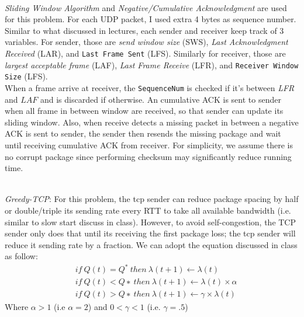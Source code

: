 \documentclass[12pt]{article}
\newenvironment{problem}[2][Problem]{\begin{trivlist}
\item[\hskip \labelsep {\bfseries #1}\hskip \labelsep {\bfseries #2.}]}{\end{trivlist}}
\begin{document}
\begin{problem}{2} \ \\
    \textit{Sliding Window Algorithm} and \textit{Negative/Cumulative Acknowledgment} are used for this problem. For each UDP packet, I used extra 4 bytes as sequence number. Similar to what discussed in lectures, each sender and receiver keep track of 3 variables. For sender, those are \textit{send window size} (SWS), \textit{Last Acknowledgment Received} (LAR), and \texttt{Last Frame Sent} (LFS). Similarly for receiver, those are \textit{largest acceptable frame} (LAF), \textit{Last Frame Receive} (LFR), and \texttt{Receiver Window Size} (LFS).
    \\
    When a frame arrive at receiver, the \texttt{SequenceNum} is checked if it's between \textit{LFR} and $LAF$ and is discarded if otherwise. An cumulative ACK is sent to sender when all frame in between window are received, so that sender can update its sliding window. Also, when receive detects a missing packet in between a negative ACK is sent to sender, the sender then resends the missing package and wait until receiving cumulative ACK from receiver. For simplicity, we assume there is no corrupt package since performing checksum may significantly reduce running time.
\end{problem}
\begin{problem}{3}\ \\
    \textit{Greedy-TCP}: For this problem, the tcp sender can reduce package spacing by half or double/triple its sending rate every RTT to take all available bandwidth (i.e. similar to slow start discuss in class). However, to avoid self-congestion, the TCP sender only does that until its receiving the first package loss; the tcp sender will reduce it sending rate by a fraction. We can adopt the equation discussed in class as follow:
    \begin{equation*}
        \begin{split}
              &\ if\ Q(t) = Q^*\ then\ \lambda(t + 1) \leftarrow \lambda(t)
            \\&\ if\ Q(t) < Q∗\ then\ \lambda(t + 1) \leftarrow \lambda(t)\times \alpha
            \\&\ if\ Q(t) > Q∗\ then\ \lambda(t + 1) \leftarrow  \gamma \times \lambda(t) 
        \end{split}
    \end{equation*}
    Where $\alpha>1$ (i.e $\alpha = 2$) and $0<\gamma<1$ (i.e. $\gamma = .5$)
\end{problem}
\end{document}
